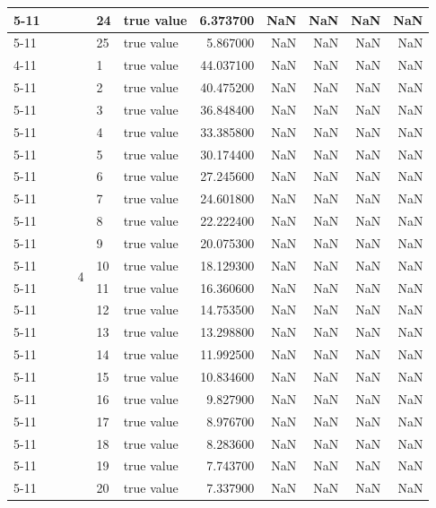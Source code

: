 \begin{tabular}{llllllrrrrr}
\cline{5-11}
 &  &  &  & 24 & true value & 6.373700 & NaN & NaN & NaN & NaN \\
\cline{5-11}
 &  &  &  & 25 & true value & 5.867000 & NaN & NaN & NaN & NaN \\
\cline{4-11} \cline{5-11}
 &  &  & \multirow[t]{25}{*}{4} & 1 & true value & 44.037100 & NaN & NaN & NaN & NaN \\
\cline{5-11}
 &  &  &  & 2 & true value & 40.475200 & NaN & NaN & NaN & NaN \\
\cline{5-11}
 &  &  &  & 3 & true value & 36.848400 & NaN & NaN & NaN & NaN \\
\cline{5-11}
 &  &  &  & 4 & true value & 33.385800 & NaN & NaN & NaN & NaN \\
\cline{5-11}
 &  &  &  & 5 & true value & 30.174400 & NaN & NaN & NaN & NaN \\
\cline{5-11}
 &  &  &  & 6 & true value & 27.245600 & NaN & NaN & NaN & NaN \\
\cline{5-11}
 &  &  &  & 7 & true value & 24.601800 & NaN & NaN & NaN & NaN \\
\cline{5-11}
 &  &  &  & 8 & true value & 22.222400 & NaN & NaN & NaN & NaN \\
\cline{5-11}
 &  &  &  & 9 & true value & 20.075300 & NaN & NaN & NaN & NaN \\
\cline{5-11}
 &  &  &  & 10 & true value & 18.129300 & NaN & NaN & NaN & NaN \\
\cline{5-11}
 &  &  &  & 11 & true value & 16.360600 & NaN & NaN & NaN & NaN \\
\cline{5-11}
 &  &  &  & 12 & true value & 14.753500 & NaN & NaN & NaN & NaN \\
\cline{5-11}
 &  &  &  & 13 & true value & 13.298800 & NaN & NaN & NaN & NaN \\
\cline{5-11}
 &  &  &  & 14 & true value & 11.992500 & NaN & NaN & NaN & NaN \\
\cline{5-11}
 &  &  &  & 15 & true value & 10.834600 & NaN & NaN & NaN & NaN \\
\cline{5-11}
 &  &  &  & 16 & true value & 9.827900 & NaN & NaN & NaN & NaN \\
\cline{5-11}
 &  &  &  & 17 & true value & 8.976700 & NaN & NaN & NaN & NaN \\
\cline{5-11}
 &  &  &  & 18 & true value & 8.283600 & NaN & NaN & NaN & NaN \\
\cline{5-11}
 &  &  &  & 19 & true value & 7.743700 & NaN & NaN & NaN & NaN \\
\cline{5-11}
 &  &  &  & 20 & true value & 7.337900 & NaN & NaN & NaN & NaN \\

\end{tabular}
